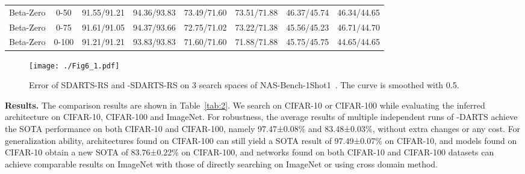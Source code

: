 \documentclass[10pt,twocolumn,letterpaper]{article}
\begin{document}
\begin{table*}[t]
\begin{center}
\begin{tabular}{cccccccc}
Beta-Zero                  & 0-50                                                                        & 91.55/91.21   & 94.36/93.83  & 73.49/71.60   & 73.51/71.88   & 46.37/45.74      & 46.34/44.65     \\
Beta-Zero                  & 0-75                                                                        & 91.61/91.05   & 94.37/93.66  & 72.75/71.02   & 73.22/71.38   & 45.56/45.23      & 46.71/44.70     \\
Beta-Zero                  & 0-100                                                                       & 91.21/91.21   & 93.83/93.83  & 71.60/71.60   & 71.88/71.88   & 45.75/45.75      & 44.65/44.65     \\ \hline
\end{tabular}
\end{center}
\vspace{-12pt}
\end{table*}
\begin{figure*}[t] 
    \vspace{-3pt}	
	\centering
\texttt{[image: ./Fig6\_1.pdf]}
\vspace{-12pt}
	\caption{Error of SDARTS-RS and -SDARTS-RS on 3 search spaces of NAS-Bench-1Shot1~\cite{1shot1}. The curve is smoothed with 0.5.}
	\label{fig:6}
	\vspace{-10pt}	
\end{figure*}


\noindent\textbf{Results.} The comparison results are shown in Table~\ref{tab:2}. We search on CIFAR-10 or CIFAR-100 while evaluating the inferred architecture on CIFAR-10, CIFAR-100 and ImageNet. For robustness, the average results of multiple independent runs of -DARTS achieve the SOTA performance on both CIFAR-10 and CIFAR-100, namely 97.47±0.08\% and 83.48±0.03\%, without extra changes or any cost. For generalization ability, architectures found on CIFAR-100 can still yield a SOTA result of 97.49±0.07\% on CIFAR-10, and models found on CIFAR-10 obtain a new SOTA of 83.76±0.22\%  on CIFAR-100, and networks found on both CIFAR-10 and CIFAR-100 datasets can achieve comparable results on ImageNet with those of directly searching on ImageNet or using cross domain method. 
\end{document}

